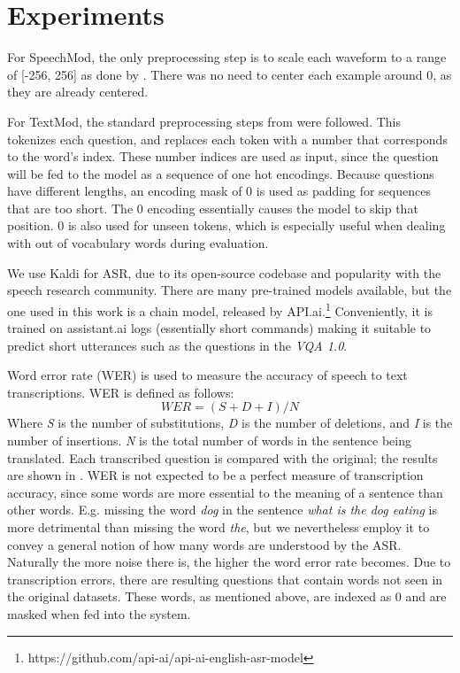 \documentclass[letterpaper]{article} %
\begin{document}
\section{Experiments}
\label{sec:experiment}
For SpeechMod, the only preprocessing step is to scale each waveform to a range of [-256, 256] as done by . There was no need to center each example around 0, as they are already centered.

For TextMod, the standard preprocessing steps from  were followed. This tokenizes each question, and replaces each token with a number that corresponds to the word’s index. These number indices are used as input, since the question will be fed to the model as a sequence of one hot encodings. Because questions have different lengths, an encoding mask of 0 is used as padding for sequences that are too short. The 0 encoding essentially causes the model to skip that position. 0 is also used for unseen tokens, which is especially useful when dealing with out of vocabulary words during evaluation.

We use Kaldi  for ASR, due to its open-source codebase and popularity with the speech research community. There are many pre-trained models available, but the one used in this work is a chain model, released by API.ai.\footnote{https://github.com/api-ai/api-ai-english-asr-model} Conveniently, it is trained on assistant.ai logs (essentially short commands) making it suitable to predict short utterances such as the questions in the \textit{VQA 1.0}.

Word error rate (WER) is used to measure the accuracy of speech to text transcriptions. WER is defined as follows: 
\begin{displaymath}
  \mathit{WER} = (S+D+I)/N
\end{displaymath}
Where \textit{S} is the number of substitutions, \textit{D} is the number of deletions, and \textit{I} is the number of insertions. \textit{N} is the total number of words in the sentence being translated. Each transcribed question is compared with the original; the results are shown in . WER is not expected to be a perfect measure of transcription accuracy, since some words are more essential to the meaning of a sentence than other words. E.g. missing the word \emph{dog} in the sentence \emph{what is the dog eating} is more detrimental than missing the word \emph{the}, but we nevertheless employ it to convey a general notion of how many words are understood by the ASR. Naturally the more noise there is, the higher the word error rate becomes. Due to transcription errors, there are resulting questions that contain words not seen in the original datasets. These words, as mentioned above, are indexed as 0 and are masked when fed into the system.
\end{document}
